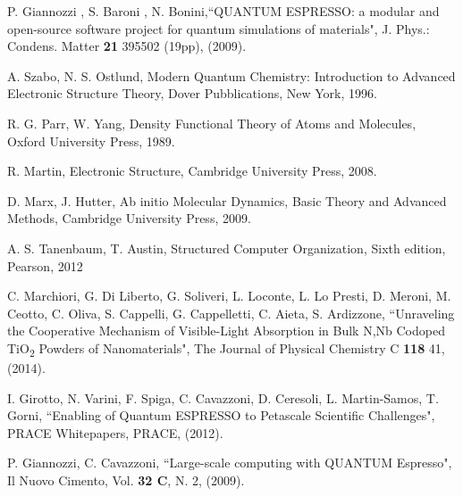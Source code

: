 \documentclass[a4paper,10pt]{article}
\begin{document}
\begin{thebibliography}{9}


P. Giannozzi , S. Baroni , N. Bonini,``QUANTUM ESPRESSO: a modular and open-source software project for quantum simulations of materials", J. Phys.: Condens. Matter \textbf{21} 395502 (19pp), (2009).

A. Szabo, N. S. Ostlund,
Modern Quantum Chemistry: Introduction to Advanced Electronic Structure Theory,
Dover Pubblications, New York,
1996.


R. G. Parr, W. Yang,
Density Functional Theory of Atoms and Molecules,
Oxford University Press,
1989.


R. Martin, 
Electronic Structure,
Cambridge University Press,
2008.


D. Marx, J. Hutter,
Ab initio Molecular Dynamics,
Basic Theory and Advanced Methods,
Cambridge University Press,
2009.


A. S. Tanenbaum, T. Austin,
Structured Computer Organization,
Sixth edition,
Pearson,
2012


C. Marchiori, G. Di Liberto, G. Soliveri, L. Loconte, L. Lo Presti, D. Meroni, M. Ceotto, C. Oliva, S. Cappelli, G. Cappelletti, C. Aieta, S. Ardizzone,
``Unraveling the Cooperative Mechanism of Visible-Light Absorption in Bulk N,Nb Codoped TiO\textsubscript{2} Powders of Nanomaterials",
The Journal of Physical Chemistry C \textbf{118} 41, (2014).

I. Girotto, N. Varini, F. Spiga, C. Cavazzoni, D. Ceresoli, L. Martin-Samos, T. Gorni,
``Enabling of Quantum ESPRESSO to Petascale Scientific Challenges",
PRACE Whitepapers,
PRACE,
(2012).

P. Giannozzi, C. Cavazzoni,
``Large-scale computing with QUANTUM Espresso",
Il Nuovo Cimento, Vol. \textbf{32 C}, N. 2, (2009).






\end{thebibliography}
\end{document}
